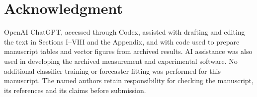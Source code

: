 \documentclass[nolineno]{ieeeaccess}
\begin{document}
\section*{Acknowledgment}
OpenAI ChatGPT, accessed through Codex, assisted with drafting and editing the text in Sections I--VIII and the Appendix, and with code used to prepare manuscript tables and vector figures from archived results. AI assistance was also used in developing the archived measurement and experimental software. No additional classifier training or forecaster fitting was performed for this manuscript. The named authors retain responsibility for checking the manuscript, its references and its claims before submission.


\EOD
\end{document}
